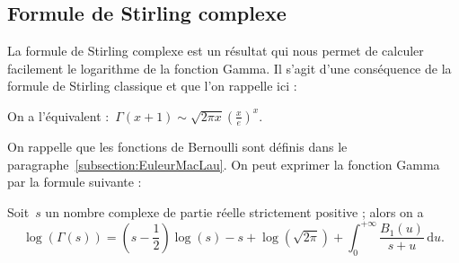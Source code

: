 	\subsection[Formule de Stirling complexe]{Formule de Stirling complexe}
		La formule de Stirling complexe est un résultat qui nous permet de calculer facilement le logarithme de la fonction Gamma. Il s'agit d'une conséquence de la formule de Stirling classique et que l'on rappelle ici :
		\begin{prop}
			On a l'équivalent :~$\displaystyle\Gamma(x+1) \sim \sqrt{2\pi x} \left(\frac{x}{e} \right)^x$.
		\end{prop}
		On rappelle que les fonctions de Bernoulli sont définis dans le paragraphe~\ref{subsection:EuleurMacLau}. On peut exprimer la fonction Gamma par la formule suivante :
		\begin{thm}\label{thm:tT7}
			Soit~$s$ un nombre complexe de partie réelle strictement positive ; alors on a
			\[
				\log(\Gamma(s)) = \left(s-\frac{1}{2}\right)\log(s) - s + \log\left(\sqrt{2\pi}\right)
				+ \int_{0}^{+\infty} \frac{B_1(u)}{s+u}\,\mathrm{d}u.
			\]
		\end{thm}
